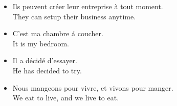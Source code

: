 \begin{itemize}
	\item  Ils peuvent cr{\'e}er leur entreprise {\`a} tout moment. \\ They can setup their business anytime.
	\item  C'est ma chambre {\'a} coucher. \\ It is my bedroom.
	\item  Il a d{\'e}cid{\'e} d'essayer. \\ He has decided to try.
	\item  Nous mangeons pour vivre, et vivons pour manger. \\ We eat to live, and we live to eat.
\end{itemize}







